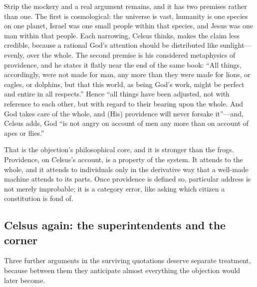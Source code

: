 Strip the mockery and a real argument remains, and it has two premises rather than one. The first is cosmological: the universe is vast, humanity is one species on one planet, Israel was one small people within that species, and Jesus was one man within that people. Each narrowing, Celsus thinks, makes the claim less credible, because a rational God's attention should be distributed like sunlight---evenly, over the whole. The second premise is his considered metaphysics of providence, and he states it flatly near the end of the same book: ``All things, accordingly, were not made for man, any more than they were made for lions, or eagles, or dolphins, but that this world, as being God's work, might be perfect and entire in all respects.'' Hence ``all things have been adjusted, not with reference to each other, but with regard to their bearing upon the whole. And God takes care of the whole, and (His) providence will never forsake it''---and, Celsus adds, God ``is not angry on account of men any more than on account of apes or flies.''

That is the objection's philosophical core, and it is stronger than the frogs. Providence, on Celsus's account, is a property of the system. It attends to the whole, and it attends to individuals only in the derivative way that a well-made machine attends to its parts. Once providence is defined so, particular address is not merely improbable; it is a category error, like asking which citizen a constitution is fond of.

\subsection{Celsus again: the superintendents and the corner}

Three further arguments in the surviving quotations deserve separate treatment, because between them they anticipate almost everything the objection would later become.

